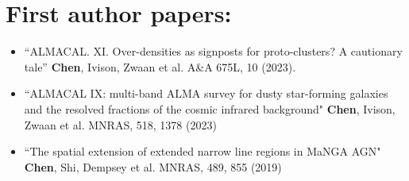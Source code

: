 \documentclass[A4,11pt]{article}
\newenvironment{paperlist}
{ \begin{itemize}[leftmargin=0.8cm, label={$\bullet$}]
    \setlength{\itemsep}{1pt}
    \setlength{\parskip}{1pt}
    \setlength{\parsep}{1pt}     }
{ \end{itemize}                  }
\begin{document}
\section{First author papers:}
\begin{paperlist}
    \item ``ALMACAL. XI. Over-densities as signposts for proto-clusters? A cautionary tale'' {\bf Chen}, Ivison, Zwaan et al. A\&A 675L, 10 (2023). 
    \item ``ALMACAL IX: multi-band ALMA survey for dusty star-forming galaxies and the resolved fractions of the cosmic infrared background" {\bf Chen}, Ivison, Zwaan et al. MNRAS, 518, 1378 (2023)
    \item ``The spatial extension of extended narrow line regions in MaNGA AGN" {\bf Chen}, Shi, Dempsey et al. MNRAS, 489, 855 (2019)
\end{paperlist}
\end{document}
